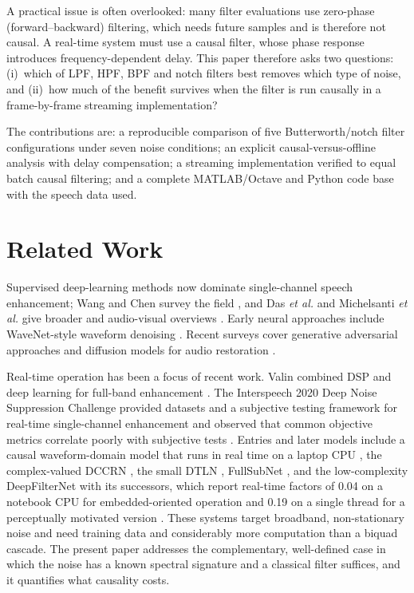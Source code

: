 \documentclass[conference]{IEEEtran}
\begin{document}
A practical issue is often overlooked: many filter evaluations use zero-phase (forward--backward) filtering, which needs future samples and is therefore not causal. A real-time system must use a causal filter, whose phase response introduces frequency-dependent delay. This paper therefore asks two questions: (i)~which of LPF, HPF, BPF and notch filters best removes which type of noise, and (ii)~how much of the benefit survives when the filter is run causally in a frame-by-frame streaming implementation?

The contributions are: a reproducible comparison of five Butterworth/notch filter configurations under seven noise conditions; an explicit causal-versus-offline analysis with delay compensation; a streaming implementation verified to equal batch causal filtering; and a complete MATLAB/Octave and Python code base with the speech data used.

\section{Related Work}
Supervised deep-learning methods now dominate single-channel speech enhancement; Wang and Chen survey the field \cite{wang2018supervised}, and Das \textit{et al.} and Michelsanti \textit{et al.} give broader and audio-visual overviews \cite{das2021fundamentals,michelsanti2021overview}. Early neural approaches include WaveNet-style waveform denoising \cite{rethage2018wavenet}. Recent surveys cover generative adversarial approaches \cite{ramonaite2026gan} and diffusion models for audio restoration \cite{lemercier2024diffusion}.

Real-time operation has been a focus of recent work. Valin combined DSP and deep learning for full-band enhancement \cite{valin2018hybrid}. The Interspeech 2020 Deep Noise Suppression Challenge provided datasets and a subjective testing framework for real-time single-channel enhancement and observed that common objective metrics correlate poorly with subjective tests \cite{reddy2020dns}. Entries and later models include a causal waveform-domain model that runs in real time on a laptop CPU \cite{defossez2020real}, the complex-valued DCCRN \cite{hu2020dccrn}, the small DTLN \cite{westhausen2020dtln}, FullSubNet \cite{hao2021fullsubnet}, and the low-complexity DeepFilterNet \cite{schroeter2022deepfilternet} with its successors, which report real-time factors of 0.04 on a notebook CPU for embedded-oriented operation \cite{schroeter2022dfn2} and 0.19 on a single thread for a perceptually motivated version \cite{schroeter2023dfn3}. These systems target broadband, non-stationary noise and need training data and considerably more computation than a biquad cascade. The present paper addresses the complementary, well-defined case in which the noise has a known spectral signature and a classical filter suffices, and it quantifies what causality costs.
\end{document}
